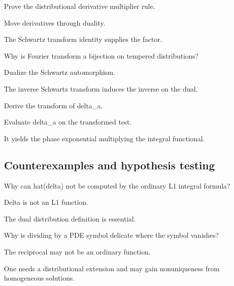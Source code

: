 \begin{exercise}\label{exr:iii19-expand-07}
Prove the distributional derivative multiplier rule.
\end{exercise}
\begin{hint}
Move derivatives through duality.
\end{hint}
\begin{solution}
The Schwartz transform identity supplies the factor.
\end{solution}

\begin{exercise}[Automorphism]\label{exr:iii19-expand-08}
Why is Fourier transform a bijection on tempered distributions?
\end{exercise}
\begin{hint}
Dualize the Schwartz automorphism.
\end{hint}
\begin{solution}
The inverse Schwartz transform induces the inverse on the dual.
\end{solution}

\begin{exercise}\label{exr:iii19-expand-09}
Derive the transform of delta\_a.
\end{exercise}
\begin{hint}
Evaluate delta\_a on the transformed test.
\end{hint}
\begin{solution}
It yields the phase exponential multiplying the integral functional.
\end{solution}

\subsection*{Counterexamples and hypothesis testing}

\begin{exercise}\label{exr:iii19-expand-10}
Why can hat(delta) not be computed by the ordinary L1 integral formula?
\end{exercise}
\begin{hint}
Delta is not an L1 function.
\end{hint}
\begin{solution}
The dual distribution definition is essential.
\end{solution}

\begin{exercise}\label{exr:iii19-expand-11}
Why is dividing by a PDE symbol delicate where the symbol vanishes?
\end{exercise}
\begin{hint}
The reciprocal may not be an ordinary function.
\end{hint}
\begin{solution}
One needs a distributional extension and may gain nonuniqueness from homogeneous solutions.
\end{solution}

